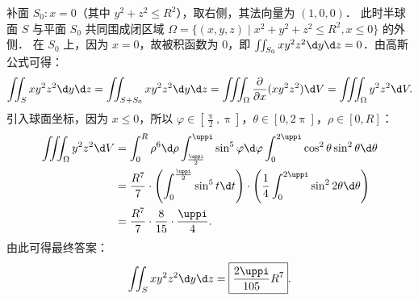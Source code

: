 \begin{solution}

    补面 $S_0: x = 0$（其中 $y^2 + z^2 \le R^2$），取右侧，其法向量为 $(1, 0, 0)$．
    此时半球面 $S$ 与平面 $S_0$ 共同围成闭区域 $\Omega = \{ (x, y, z) \mid x^2 + y^2 + z^2 \le R^2, x \le 0 \}$ 的外侧．
    在 $S_0$ 上，因为 $x = 0$，故被积函数为 $0$，即 $\iint_{S_0} x y^2 z^2 \d y \d z = 0$．由高斯公式可得：
    \begin{equation}
        \label{eq:hemisphere-left-1}
        \iint_{S} x y^2 z^2 \d y \d z = \iint_{S + S_0} x y^2 z^2 \d y \d z = \iiint_{\Omega} \frac{\partial}{\partial x} (x y^2 z^2) \d V = \iiint_{\Omega} y^2 z^2 \d V.
    \end{equation}
    引入球面坐标，因为 $x \le 0$，所以 $\varphi \in \left[ \frac{\uppi}{2}, \uppi \right]$，$\theta \in [0, 2\uppi]$，$\rho \in [0, R]$：
    \begin{equation}
        \label{eq:hemisphere-left-2}
        \begin{aligned}
            \iiint_{\Omega} y^2 z^2 \d V & = \int_0^R \rho^6 \d \rho \int_{\frac{\uppi}{2}}^{\uppi} \sin^5 \varphi \d \varphi \int_0^{2\uppi} \cos^2 \theta \sin^2 \theta \d \theta              \\
                                         & = \frac{R^7}{7} \cdot \left( \int_0^{\frac{\uppi}{2}} \sin^5 t \d t \right) \cdot \left( \frac{1}{4} \int_0^{2\uppi} \sin^2 2\theta \d \theta \right) \\
                                         & = \frac{R^7}{7} \cdot \frac{8}{15} \cdot \frac{\uppi}{4}.
        \end{aligned}
    \end{equation}
    由此可得最终答案：
    \begin{equation}
        \label{eq:hemisphere-left-3}
        \iint_{S} x y^2 z^2 \d y \d z = \boxed{\frac{2 \uppi}{105} R^7}.
    \end{equation}



\end{solution}
